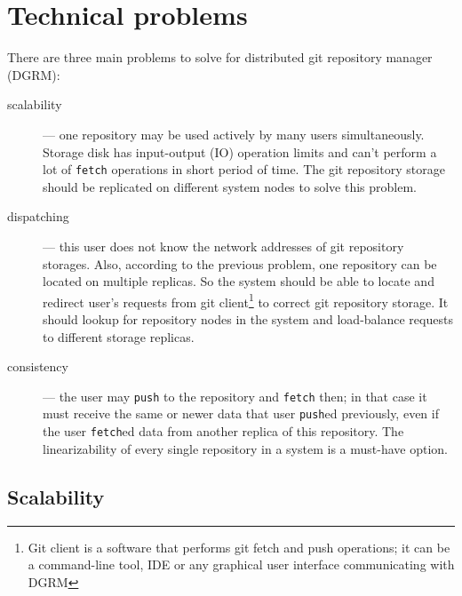 \documentclass[acmlarge, screen, nonacm]{acmart}
\newcommand{\code}[1]{\texttt{#1}}
\begin{document}
\section{Technical problems}


There are three main problems to solve for distributed git repository manager (DGRM):
\begin{description}
\item[scalability] --- one repository may be used actively by many users simultaneously. Storage disk
  has input-output (IO) operation limits and can't perform a lot of \code{fetch} operations in
  short period of time. The git repository storage should be replicated on different system nodes to
  solve this problem.
\item[dispatching] --- this user does not know the network addresses of git repository storages. Also, according to the
  previous problem, one repository can be located on multiple replicas.
  So the system should be able to locate and redirect user's requests
  from git client\footnote{Git client is a software that performs git fetch and push operations; it can be
  a command-line tool, IDE or any graphical user interface communicating with DGRM} to correct git repository
  storage. It should lookup for repository nodes in the system and load-balance requests to different storage replicas.
\item[consistency] --- the user may \code{push} to the repository and \code{fetch} then; in that case it must receive
  the same or newer data that user \code{push}ed previously, even if the user \code{fetch}ed data from another
  replica of this repository. The linearizability of every single repository in a system is a must-have option.
\end{description}

\subsection{Scalability}
\end{document}
